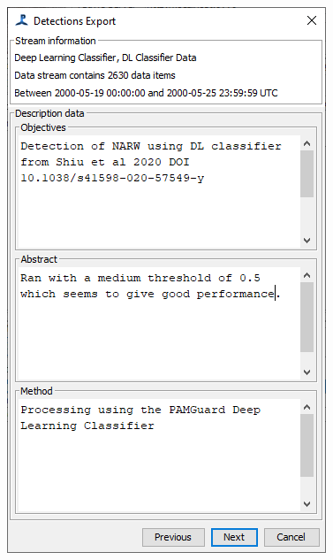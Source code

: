 \documentclass[
]{article}
\begin{document}
\begin{figure}
\begin{minipage}{0.33\linewidth}
{\includegraphics[width=0.99\linewidth,height=\textheight,keepaspectratio]{./media/export3.png}

}


\end{minipage}%
\newline
\begin{minipage}{0.33\linewidth}

\centering{

}
\end{minipage}
\end{figure}
\end{document}
